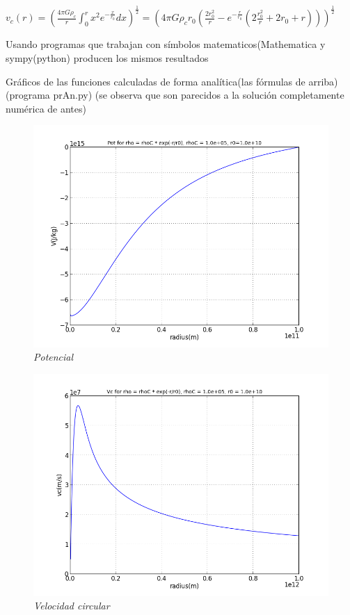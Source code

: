 \documentclass[12pt]{book}
\begin{document}
\begin{description}
\item $v_c(r) = (\frac{4 \pi G \rho_c}{r}\int_0^r{x^2 e^{-\frac{x}{r_0}}dx} )^{\frac{1}{2}}   
= (4 \pi G \rho_c r_0 (\frac{2 r_0^2}{r} -  e^{-\frac{r}{r_0}} (2 \frac{r_0^2}{r} +  2 r_0 + r) ))^{\frac{1}{2}} $


\item Usando programas que trabajan con símbolos matematicos(Mathematica y sympy(python) producen los mismos resultados 



\item Gráficos de las funciones calculadas de forma analítica(las fórmulas de arriba) (programa prAn.py) (se observa que son parecidos a la solución completamente numérica de antes)


\begin{figure}[!ht]
 \centering
 \includegraphics[scale=0.4]{potAn.png}
 \caption{\emph{Potencial}}
\end{figure}

\begin{figure}[!ht]
 \centering
 \includegraphics[scale=0.4]{vcAn.png}
 \caption{\emph{Velocidad circular}}
\end{figure}


\end{description}
\end{document}
